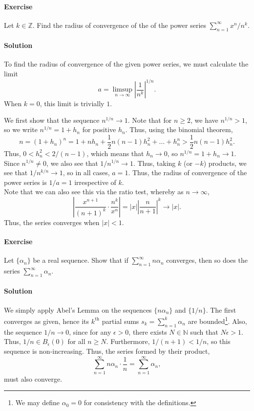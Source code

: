 \documentclass[10pt]{article}
\newcounter{prob}
\def\problem{\stepcounter{prob}\paragraph{Exercise \arabic{prob}}}
\def\solution{\paragraph{Solution}}
\begin{document}
        \problem Let $k \in \mathbb{Z}$. Find the radius of convergence of the of the power series $\sum_{n = 1}^\infty x^n /n^k$.

        \solution To find the radius of convergence of the given power series, we must calculate the limit
        \[
                a = \limsup_{n \to \infty} \left|\frac{1}{n^k}\right|^{1 /n}.
        \]
        When $k = 0$, this limit is trivially $1$.

        We first show that the sequence $n^{1 /n} \to 1$. Note that for $n\geq 2$, we have $n^{1 /n} > 1$, so we write $n^{1 /n} = 1 + h_n$
        for positive $h_n$.
        Thus, using the binomial theorem, 
        \[
                n = (1 + h_n)^n = 1 + nh_n + \frac{1}{2}n(n - 1)h_n^2 + \dots + h_n^n > \frac{1}{2}n(n - 1)h_n^2.
        \]
        Thus, $0 < h_n^2 < 2 /(n - 1)$, which means that $h_n \to 0$, so $n^{1 /n} = 1 + h_n \to 1$.
        Since $n^{1 /n} \neq 0$, we also see that $1 /n^{1 /n} \to 1$.
        Thus, taking $k$ (or $-k$) products, we see that $1 / n^{k /n} \to 1$, so in all cases, $a = 1$.
        Thus, the radius of convergence of the power series is $1 /a = 1$ irrespective of $k$. \\

        Note that we can also see this via the ratio test, whereby as $n \to \infty$,
        \[
                \left|\frac{x^{n + 1}}{(n + 1)^k}\cdot\frac{n^k}{x^n}\right| = |x|\left|\frac{n}{n + 1}\right|^k \to |x|.
        \]
        Thus, the series converges when $|x| < 1$.

        \problem Let $\{\alpha_n\}$ be a real sequence. Show that if $\sum_{n = 1}^\infty n\alpha_n$ converges, then so does the series
        $\sum_{n = 1}^\infty \alpha_n$.
        
        \solution We simply apply Abel's Lemma on the sequences $\{n\alpha_n\}$ and $\{1 /n\}$. The first converges as given, hence
        its $k^\text{th}$ partial sums $s_k = \sum_{n = 1}^k \alpha_n$ are bounded\footnote{We may define $\alpha_0 = 0$ for consistency
        with the definitions.}. Also, the sequence $1 /n \to 0$, since for any $\epsilon > 0$, there exists $N \in \mathbb{N}$ such that
        $N\epsilon > 1$. Thus, $1 /n \in B_\epsilon(0)$ for all $n \geq N$. Furthermore, $1 /(n + 1) < 1 /n$, so this sequence is non-increasing.
        Thus, the series formed by their product,
        \[
                \sum_{n = 1}^\infty n\alpha_n \cdot \frac{1}{n} = \sum_{n = 1}^\infty \alpha_n,
        \]
        must also converge.
\end{document}
